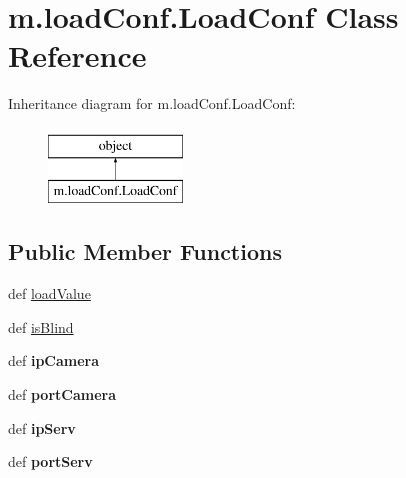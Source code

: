 \hypertarget{classm_1_1load_conf_1_1_load_conf}{\section{m.\-load\-Conf.\-Load\-Conf Class Reference}
\label{classm_1_1load_conf_1_1_load_conf}
}
Inheritance diagram for m.\-load\-Conf.\-Load\-Conf\-:\begin{figure}[H]
\begin{center}
\leavevmode
\includegraphics[height=2.000000cm]{classm_1_1load_conf_1_1_load_conf}
\end{center}
\end{figure}
\subsection*{Public Member Functions}
\begin{DoxyCompactItemize}
\item 
def \hyperlink{classm_1_1load_conf_1_1_load_conf_ae831fd20f8770ee87d26e6c34febea5b}{load\-Value}
\item 
def \hyperlink{classm_1_1load_conf_1_1_load_conf_ac3be38f004ccea7185b261b0e16ccbc2}{is\-Blind}
\item 
\hypertarget{classm_1_1load_conf_1_1_load_conf_a90af7dd2fda7be0dea8b4a65ce38eb2f}{def {\bfseries ip\-Camera}}\label{classm_1_1load_conf_1_1_load_conf_a90af7dd2fda7be0dea8b4a65ce38eb2f}

\item 
\hypertarget{classm_1_1load_conf_1_1_load_conf_a6db2941a05e53d8eb028c38dce89a5dc}{def {\bfseries port\-Camera}}\label{classm_1_1load_conf_1_1_load_conf_a6db2941a05e53d8eb028c38dce89a5dc}

\item 
\hypertarget{classm_1_1load_conf_1_1_load_conf_a855f4f41860aa066b816236cc074f471}{def {\bfseries ip\-Serv}}\label{classm_1_1load_conf_1_1_load_conf_a855f4f41860aa066b816236cc074f471}

\item 
\hypertarget{classm_1_1load_conf_1_1_load_conf_a5318b43bf50966159fee6a88bce49e45}{def {\bfseries port\-Serv}}\label{classm_1_1load_conf_1_1_load_conf_a5318b43bf50966159fee6a88bce49e45}

\end{DoxyCompactItemize}


